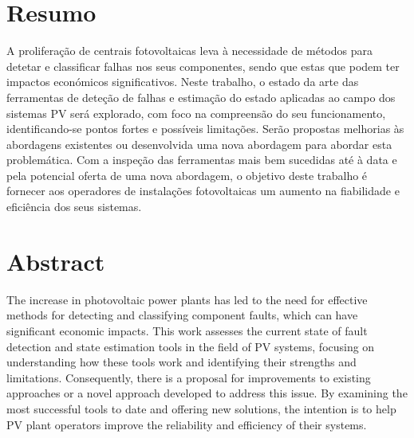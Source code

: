 \chapter*{Resumo}

A proliferação de centrais fotovoltaicas leva à necessidade de métodos para detetar e classificar falhas nos seus componentes, sendo que estas que podem ter impactos económicos significativos. Neste trabalho, o estado da arte das ferramentas de deteção de falhas e estimação do estado aplicadas ao campo dos sistemas PV será explorado, com foco na compreensão do seu funcionamento, identificando-se pontos fortes e possíveis limitações. Serão propostas melhorias às abordagens existentes ou desenvolvida uma nova abordagem para abordar esta problemática. Com a inspeção das ferramentas mais bem sucedidas até à data e pela potencial oferta de uma nova abordagem, o objetivo deste trabalho é fornecer aos operadores de instalações fotovoltaicas um aumento na fiabilidade e eficiência dos seus sistemas.


\chapter*{Abstract}

The increase in photovoltaic power plants has led to the need for effective methods for detecting and classifying component faults, which can have significant economic impacts. This work assesses the current state of fault detection and state estimation tools in the field of PV systems, focusing on understanding how these tools work and identifying their strengths and limitations. Consequently, there is a proposal for improvements to existing approaches or a novel approach developed to address this issue. By examining the most successful tools to date and offering new solutions, the intention is to help PV plant operators improve the reliability and efficiency of their systems.